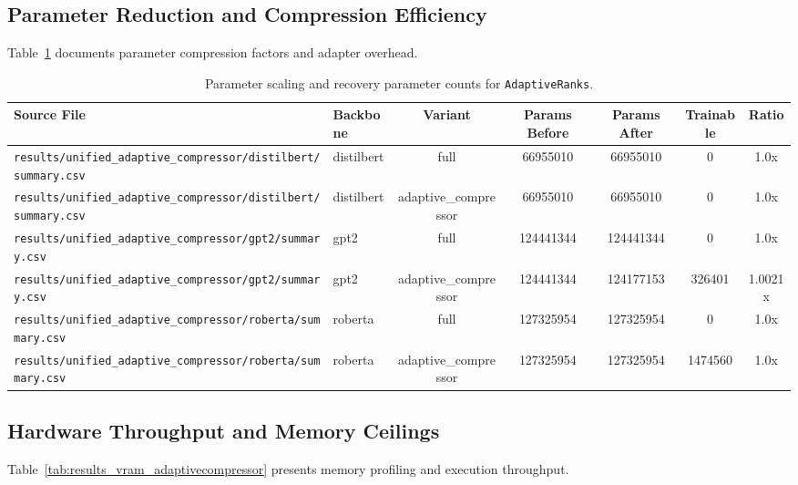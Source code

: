 \subsection{Parameter Reduction and Compression Efficiency}
Table~\ref{tab:results_params_adaptivecompressor} documents parameter compression factors and adapter overhead.

\begin{table}[t]
\centering
\small
\begin{tabular}{llccccc}
\toprule
\textbf{Source File} & \textbf{Backbone} & \textbf{Variant} & \textbf{Params Before} & \textbf{Params After} & \textbf{Trainable} & \textbf{Ratio} \\
\midrule
\texttt{results/unified\_adaptive\_compressor/distilbert/summary.csv} & distilbert & full & 66955010 & 66955010 & 0 & 1.0x \\
\texttt{results/unified\_adaptive\_compressor/distilbert/summary.csv} & distilbert & adaptive\_compressor & 66955010 & 66955010 & 0 & 1.0x \\
\texttt{results/unified\_adaptive\_compressor/gpt2/summary.csv} & gpt2 & full & 124441344 & 124441344 & 0 & 1.0x \\
\texttt{results/unified\_adaptive\_compressor/gpt2/summary.csv} & gpt2 & adaptive\_compressor & 124441344 & 124177153 & 326401 & 1.0021x \\
\texttt{results/unified\_adaptive\_compressor/roberta/summary.csv} & roberta & full & 127325954 & 127325954 & 0 & 1.0x \\
\texttt{results/unified\_adaptive\_compressor/roberta/summary.csv} & roberta & adaptive\_compressor & 127325954 & 127325954 & 1474560 & 1.0x \\
\bottomrule
\end{tabular}
\caption{Parameter scaling and recovery parameter counts for \texttt{AdaptiveRanks}.}
\label{tab:results_params_adaptivecompressor}
\end{table}

\subsection{Hardware Throughput and Memory Ceilings}
Table~\ref{tab:results_vram_adaptivecompressor} presents memory profiling and execution throughput.

